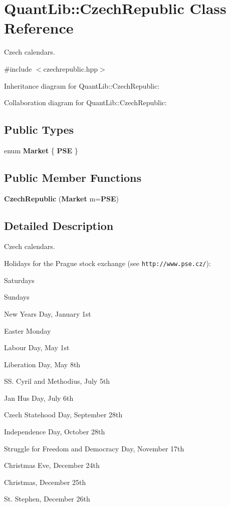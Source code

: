 \section{Quant\+Lib\+:\+:Czech\+Republic Class Reference}
\label{class_quant_lib_1_1_czech_republic}


Czech calendars.  




{\ttfamily \#include $<$czechrepublic.\+hpp$>$}



Inheritance diagram for Quant\+Lib\+:\+:Czech\+Republic\+:


Collaboration diagram for Quant\+Lib\+:\+:Czech\+Republic\+:
\subsection*{Public Types}
\begin{DoxyCompactItemize}
\item 
enum {\bf Market} \{ {\bf P\+SE}
 \}
\end{DoxyCompactItemize}
\subsection*{Public Member Functions}
\begin{DoxyCompactItemize}
\item 
{\bf Czech\+Republic} ({\bf Market} m={\bf P\+SE})
\end{DoxyCompactItemize}


\subsection{Detailed Description}
Czech calendars. 

Holidays for the Prague stock exchange (see {\tt http\+://www.\+pse.\+cz/})\+: 
\begin{DoxyItemize}
\item Saturdays 
\item Sundays 
\item New Year\textquotesingle{}s Day, January 1st 
\item Easter Monday 
\item Labour Day, May 1st 
\item Liberation Day, May 8th 
\item SS. Cyril and Methodius, July 5th 
\item Jan Hus Day, July 6th 
\item Czech Statehood Day, September 28th 
\item Independence Day, October 28th 
\item Struggle for Freedom and Democracy Day, November 17th 
\item Christmas Eve, December 24th 
\item Christmas, December 25th 
\item St. Stephen, December 26th 
\end{DoxyItemize}

